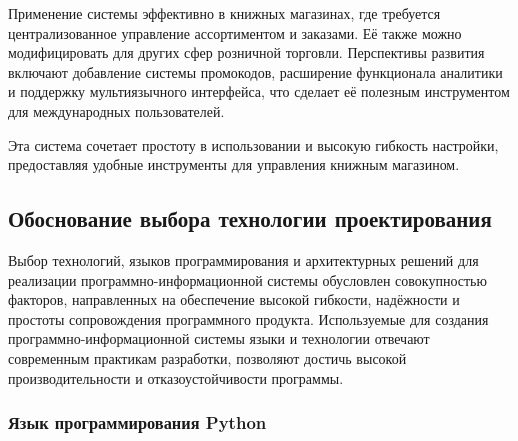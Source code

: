 Применение системы эффективно в книжных магазинах, где требуется централизованное управление ассортиментом и заказами. Её также можно модифицировать для других сфер розничной торговли. Перспективы развития включают добавление системы промокодов, расширение функционала аналитики и поддержку мультиязычного интерфейса, что сделает её полезным инструментом для международных пользователей.

Эта система сочетает простоту в использовании и высокую гибкость настройки, предоставляя удобные инструменты для управления книжным магазином.

\subsection{Обоснование выбора технологии проектирования}

Выбор технологий, языков программирования и архитектурных решений для реализации программно-информационной системы обусловлен совокупностью факторов, направленных на обеспечение высокой гибкости, надёжности и простоты сопровождения программного продукта. Используемые для создания программно-информационной системы языки и технологии отвечают современным практикам разработки, позволяют достичь высокой производительности и отказоустойчивости программы.

\subsubsection{Язык программирования Python}


